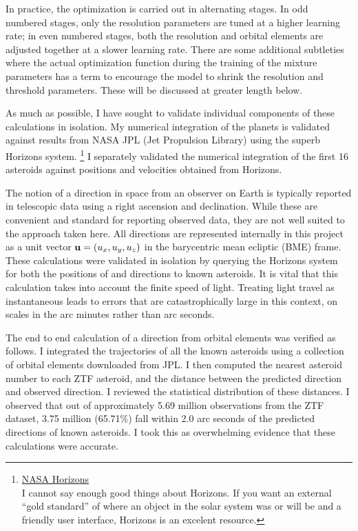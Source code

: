 In practice, the optimization is carried out in alternating stages.
In odd numbered stages, only the resolution parameters are tuned at a higher learning rate;
in even numbered stages, both the resolution and orbital elements are adjusted together at a slower learning rate.
There are some additional subtleties where the actual optimization function during the training of the mixture
parameters has a term to encourage the model to shrink the resolution and threshold parameters.
These will be discussed at greater length below.

As much as possible, I have sought to validate individual components of these calculations in isolation.
My numerical integration of the planets is validated against results from NASA JPL (Jet Propulsion Library)
using the superb Horizons system.
\footnote{
\href{https://ssd.jpl.nasa.gov/horizons.cgi}{NASA Horizons} \\
I cannot say enough good things about Horizons.
If you want an external ``gold standard'' of where an object in the solar system was or will be 
and a friendly user interface, Horizons is an excelent resource.}
I separately validated the numerical integration of the first 16 asteroids against positions and velocities obtained from Horizons.

The notion of a direction in space from an observer on Earth is typically reported in telescopic data using a right ascension and declination.
While these are convenient and standard for reporting observed data, they are not well suited to the approach taken here.
All directions are represented internally in this project as a unit vector $\mathbf{u} = (u_x, u_y, u_z)$ in the barycentric mean ecliptic (BME) frame.
These calculations were validated in isolation by querying the Horizons system for both the positions of and directions to known asteroids.
It is vital that this calculation takes into account the finite speed of light.
Treating light travel as instantaneous leads to errors that are catastrophically large in this context, on scales in the arc minutes rather than arc seconds.

The end to end calculation of a direction from orbital elements was verified as follows.
I integrated the trajectories of all the known asteroids using a collection of orbital elements downloaded from JPL.
I then computed the nearest asteroid number to each ZTF asteroid, and the distance between the predicted direction and observed direction.
I reviewed the statistical distribution of these distances.
I observed that out of approximately 5.69 million observations from the ZTF dataset,
3.75 million (65.71\%) fall within 2.0 arc seconds of the predicted directions of known asteroids.
I took this as overwhelming evidence that these calculations were accurate.


